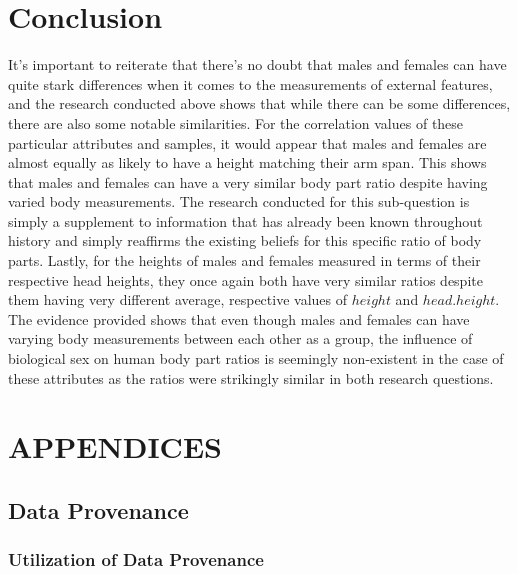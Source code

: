 \documentclass[]{article}
\begin{document}
\section{Conclusion}
\label{sec:conclusion}

It's important to reiterate that there's no doubt that males and females
can have quite stark differences when it comes to the measurements of
external features, and the research conducted above shows that while
there can be some differences, there are also some notable similarities.
For the correlation values of these particular attributes and samples,
it would appear that males and females are almost equally as likely to
have a height matching their arm span. This shows that males and females
can have a very similar body part ratio despite having varied body
measurements. The research conducted for this sub-question is simply a
supplement to information that has already been known throughout history
and simply reaffirms the existing beliefs for this specific ratio of
body parts. Lastly, for the heights of males and females measured in
terms of their respective head heights, they once again both have very
similar ratios despite them having very different average, respective
values of \(height\) and \(head.height\). The evidence provided shows
that even though males and females can have varying body measurements
between each other as a group, the influence of biological sex on human
body part ratios is seemingly non-existent in the case of these
attributes as the ratios were strikingly similar in both research
questions.

\newpage

\section{APPENDICES}
\label{sec:appendix}

\subsection{Data Provenance}
\label{sec:appendix-data-provenance}

\subsubsection{Utilization of Data Provenance}
\label{sec:appendix-provenance-explained}
\end{document}
